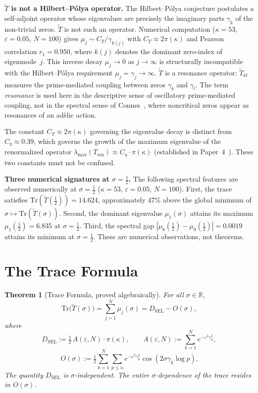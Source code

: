 \documentclass[11pt]{article}
\newtheorem{theorem}{Theorem}[section]
\newcommand{\Tt}{\widetilde{T}}
\newcommand{\DSEL}{D_{\mathrm{SEL}}}
\newcommand{\Ceta}{C_{\eta}}
\newcommand{\CT}{C_{T}}
\begin{document}
\textbf{$\Tt$ is not a Hilbert--P\'olya operator.}
The Hilbert--P\'olya conjecture postulates a self-adjoint operator
whose eigenvalues are precisely the imaginary parts $\gamma_k$ of the
non-trivial zeros.
$\Tt$ is not such an operator.
Numerical computation ($\kappa=53$, $\varepsilon=0.05$, $N=100$) gives
$\mu_j\sim\CT/\gamma_{k(j)}$ with $\CT\approx 2\pi(\kappa)$
and Pearson correlation $r_1=0.950$,
where $k(j)$ denotes the dominant zero-index of eigenmode~$j$.
This inverse decay $\mu_j\to 0$ as $j\to\infty$ is structurally
incompatible with the Hilbert--P\'olya requirement $\mu_j=\gamma_j\to\infty$.
$\Tt$ is a resonance operator: $\Tt_{kl}$ measures the prime-mediated
coupling between zeros $\gamma_k$ and $\gamma_l$.
The term \emph{resonance} is used here in the descriptive sense of
oscillatory prime-mediated coupling, not in the spectral sense of
Connes~\cite{Connes}, where noncritical zeros appear as resonances
of an ad\`elic action.

The constant $\CT\approx 2\pi(\kappa)$ governing the eigenvalue decay
is distinct from $\Ceta\approx 0.39$, which governs the growth of the
maximum eigenvalue of the renormalized operator
$\lambda_{\max}(T_{\mathrm{ren}})\approx\Ceta\cdot\pi(\kappa)$
(established in Paper~4~\cite{Paper4}).
These two constants must not be confused.

\textbf{Three numerical signatures at $\sigma=\tfrac{1}{2}$.}
The following spectral features are observed numerically at
$\sigma=\tfrac{1}{2}$ ($\kappa=53$, $\varepsilon=0.05$, $N=100$).
First, the trace satisfies $\mathrm{Tr}(\Tt(\tfrac{1}{2}))=14.624$,
approximately $47\%$ above the global minimum of
$\sigma\mapsto\mathrm{Tr}(\Tt(\sigma))$.
Second, the dominant eigenvalue $\mu_1(\sigma)$ attains its maximum
$\mu_1(\tfrac{1}{2})=6.835$ at $\sigma=\tfrac{1}{2}$.
Third, the spectral gap $|\mu_8(\tfrac{1}{2})-\mu_9(\tfrac{1}{2})|=0.0019$
attains its minimum at $\sigma=\tfrac{1}{2}$.
These are numerical observations, not theorems.

\section{The Trace Formula}
\label{sec:trace}

\begin{theorem}[Trace Formula, proved algebraically]
\label{thm:trace}
For all $\sigma\in\mathbb{R}$,
\[
\mathrm{Tr}\bigl(\Tt(\sigma)\bigr)
  = \sum_{j=1}^N \mu_j(\sigma)
  = \DSEL - O(\sigma),
\]
where
\[
\DSEL   := \tfrac{1}{2}\,A(\varepsilon,N)\cdot\pi(\kappa),\qquad
A(\varepsilon,N) := \sum_{k=1}^N e^{-\varepsilon^2\gamma_k^2},
\]
\[
O(\sigma) := \tfrac{1}{2}\sum_{k=1}^N\sum_{p\leq\kappa}
             e^{-\varepsilon^2\gamma_k^2}\cos(2\sigma\gamma_k\log p).
\]
The quantity $\DSEL$ is $\sigma$-independent.
The entire $\sigma$-dependence of the trace resides in $O(\sigma)$.
\end{theorem}
\end{document}
